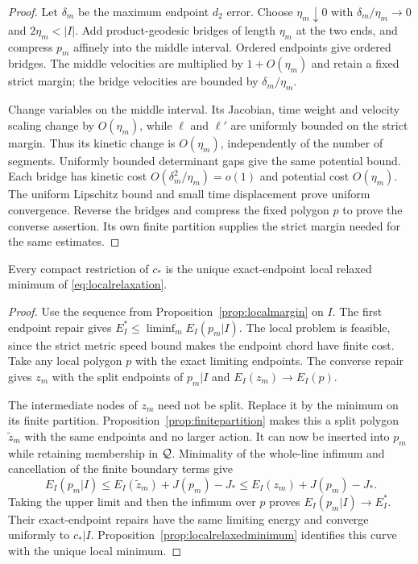 \begin{proof}
Let $\delta_m$ be the maximum endpoint $d_2$ error. Choose
$\eta_m\downarrow0$ with $\delta_m/\eta_m\to0$ and
$2\eta_m<|I|$. Add product-geodesic bridges of length $\eta_m$
at the two ends, and compress $p_m$ affinely into the middle interval.
Ordered endpoints give ordered bridges. The middle velocities are
multiplied by $1+O(\eta_m)$ and retain a fixed strict margin; the
bridge velocities are bounded by $\delta_m/\eta_m$.

Change variables on the middle interval. Its Jacobian, time weight
and velocity scaling change by $O(\eta_m)$, while $\ell$ and $\ell'$
are uniformly bounded on the strict margin. Thus its kinetic change
is $O(\eta_m)$, independently of the number of segments. Uniformly
bounded determinant gaps give the same potential bound. Each bridge
has kinetic cost $O(\delta_m^2/\eta_m)=o(1)$ and potential cost
$O(\eta_m)$. The uniform Lipschitz bound and small time displacement
prove uniform convergence. Reverse the bridges and compress the
fixed polygon $p$ to prove the converse assertion. Its own finite
partition supplies the strict margin needed for the same estimates.
\end{proof}

\begin{proposition}\label{prop:localminimality}
Every compact restriction of $c_*$ is the unique exact-endpoint local
relaxed minimum of \eqref{eq:localrelaxation}.
\end{proposition}

\begin{proof}
Use the sequence from Proposition~\ref{prop:localmargin} on $I$.
The first endpoint repair gives
$E_I^*\le\liminf_m E_I(p_m|I)$. The local problem is feasible,
since the strict metric speed bound makes the endpoint chord have
finite cost. Take any local polygon $p$ with the exact limiting
endpoints. The converse repair gives $z_m$ with the split endpoints
of $p_m|I$ and $E_I(z_m)\to E_I(p)$.

The intermediate nodes of $z_m$ need not be split. Replace it by the
minimum on its finite partition. Proposition~\ref{prop:finitepartition}
makes this a split polygon $\widetilde z_m$ with the same endpoints
and no larger action. It can now be inserted into $p_m$ while retaining
membership in $\mathcal Q$. Minimality of the whole-line infimum and
cancellation of the finite boundary terms give
\[
 E_I(p_m|I)\le E_I(\widetilde z_m)+J(p_m)-J_*
             \le E_I(z_m)+J(p_m)-J_*.
\]
Taking the upper limit and then the infimum over $p$ proves
$E_I(p_m|I)\to E_I^*$. Their exact-endpoint repairs have the same
limiting energy and converge uniformly to $c_*|I$.
Proposition~\ref{prop:localrelaxedminimum} identifies this curve
with the unique local minimum.
\end{proof}

